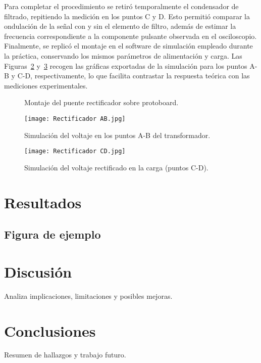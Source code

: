 \documentclass[conference]{IEEEtran} %
\begin{document}
Para completar el procedimiento se retiró temporalmente el condensador de filtrado, repitiendo la medición en los puntos C y D. Esto permitió comparar la ondulación de la señal con y sin el elemento de filtro, además de estimar la frecuencia correspondiente a la componente pulsante observada en el osciloscopio. Finalmente, se replicó el montaje en el software de simulación empleado durante la práctica, conservando los mismos parámetros de alimentación y carga. Las Figuras~\ref{fig:rectificador-simulacion-ab} y~\ref{fig:rectificador-simulacion-cd} recogen las gráficas exportadas de la simulación para los puntos A-B y C-D, respectivamente, lo que facilita contrastar la respuesta teórica con las mediciones experimentales.

\begin{figure}[htbp]
    \centering
    \framebox[0.75\linewidth]{\rule{0pt}{3.5cm}}
    \caption{Montaje del puente rectificador sobre protoboard.}
    \label{fig:rectificador-montaje}
\end{figure}

\begin{figure}[htbp]
    \centering
    \texttt{[image: Rectificador AB.jpg]}
    \caption{Simulación del voltaje en los puntos A-B del transformador.}
    \label{fig:rectificador-simulacion-ab}
\end{figure}

\begin{figure}[htbp]
    \centering
    \texttt{[image: Rectificador CD.jpg]}
    \caption{Simulación del voltaje rectificado en la carga (puntos C-D).}
    \label{fig:rectificador-simulacion-cd}
\end{figure}
\section{Resultados}
\subsection{Figura de ejemplo}



\section{Discusión}
Analiza implicaciones, limitaciones y posibles mejoras.

\section{Conclusiones}
Resumen de hallazgos y trabajo futuro.
\end{document}
